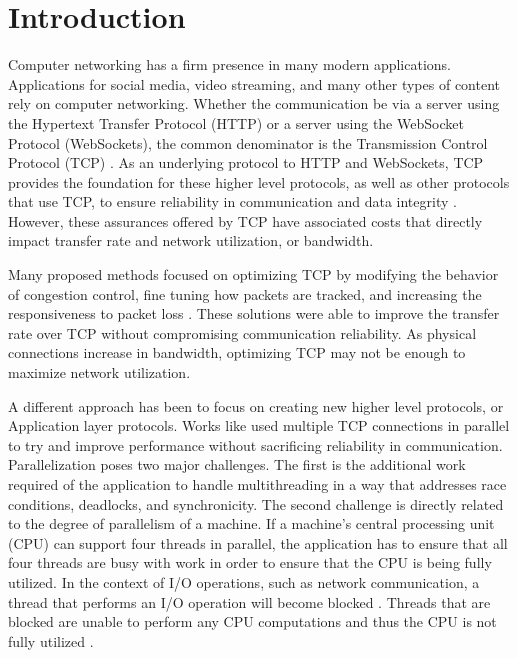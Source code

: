 \chapter{Introduction}

Computer networking has a firm presence in many modern applications. Applications for social media, video streaming, and many other types of content rely on computer networking. Whether the communication be via a server using the Hypertext Transfer Protocol (HTTP) or a server using the WebSocket Protocol (WebSockets), the common denominator is the Transmission Control Protocol (TCP) \cite{fielding1999hypertext,fette2011websocket}. As an underlying protocol to HTTP and WebSockets, TCP provides the foundation for these higher level protocols, as well as other protocols that use TCP, to ensure reliability in communication and data integrity \cite{cerf1978specification}. However, these assurances offered by TCP have associated costs that directly impact transfer rate and network utilization, or bandwidth.

Many proposed methods focused on optimizing TCP by modifying the behavior of congestion control, fine tuning how packets are tracked, and increasing the responsiveness to packet loss \cite{brakmo1995tcp,wei2006fast,xu2004binary,ha2008cubic}. These solutions were able to improve the transfer rate over TCP without compromising communication reliability. As physical connections increase in bandwidth, optimizing TCP may not be enough to maximize network utilization.

A different approach has been to focus on creating new higher level protocols, or Application layer protocols. Works like \cite{Allman1995,Allman1997,Sivakumar2000psockets} used multiple TCP connections in parallel to try and improve performance without sacrificing reliability in communication. Parallelization poses two major challenges. The first is the additional work required of the application to handle multithreading in a way that addresses race conditions, deadlocks, and synchronicity. The second challenge is directly related to the degree of parallelism of a machine. If a machine's central processing unit (CPU) can support four threads in parallel, the application has to ensure that all four threads are busy with work in order to ensure that the CPU is being fully utilized. In the context of I/O operations, such as network communication, a thread that performs an I/O operation will become blocked \cite{rhoden2014operating,lucovsky1998system,richter2012clr}. Threads that are blocked are unable to perform any CPU computations and thus the CPU is not fully utilized \cite{rhoden2014operating}.

